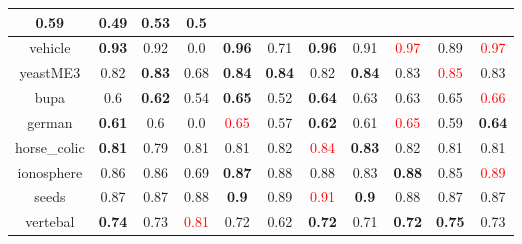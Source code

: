 \documentclass{article}%
\begin{document}
\begin{tabular}{c|cccccccccc}
{0.59
}&0.49&\textbf{0.53}&0.5\\%
\hline%
vehicle&\textbf{0.93}&0.92&0.0&\textbf{0.96}&0.71&\textbf{0.96}&0.91&\textcolor{red}{ 
0.97
}&0.89&\textcolor{red}{ 
0.97
}\\%
\hline%
yeastME3&0.82&\textbf{0.83}&0.68&\textbf{0.84}&\textbf{0.84}&0.82&\textbf{0.84}&0.83&\textcolor{red}{ 
0.85
}&0.83\\%
\hline%
bupa&0.6&\textbf{0.62}&0.54&\textbf{0.65}&0.52&\textbf{0.64}&0.63&0.63&0.65&\textcolor{red}{ 
0.66
}\\%
\hline%
german&\textbf{0.61}&0.6&0.0&\textcolor{red}{ 
0.65
}&0.57&\textbf{0.62}&0.61&\textcolor{red}{ 
0.65
}&0.59&\textbf{0.64}\\%
\hline%
horse\_colic&\textbf{0.81}&0.79&0.81&0.81&0.82&\textcolor{red}{ 
0.84
}&\textbf{0.83}&0.82&0.81&0.81\\%
\hline%
ionosphere&0.86&0.86&0.69&\textbf{0.87}&0.88&0.88&0.83&\textbf{0.88}&0.85&\textcolor{red}{ 
0.89
}\\%
\hline%
seeds&0.87&0.87&0.88&\textbf{0.9}&0.89&\textcolor{red}{ 
0.91
}&\textbf{0.9}&0.88&0.87&0.87\\%
\hline%
vertebal&\textbf{0.74}&0.73&\textcolor{red}{ 
0.81
}&0.72&0.62&\textbf{0.72}&0.71&\textbf{0.72}&\textbf{0.75}&0.73\\%
\hline%
\end{tabular}

%
\end{document}
